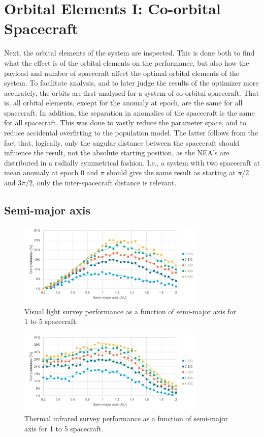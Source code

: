\section{Orbital Elements I: Co-orbital Spacecraft}
\label{sec:results_orbits_one}
Next, the orbital elements of the system are inspected. This is done both to find what the effect is of the orbital elements on the performance, but also how the payload and number of spacecraft affect the optimal orbital elements of the system. To facilitate analysis, and to later judge the results of the optimizer more accurately, the orbits are first analysed for a system of co-orbital spacecraft. That is, all orbital elements, except for the anomaly at epoch, are the same for all spacecraft. In addition, the separation in anomalies of the spacecraft is the same for all spacecraft. This was done to vastly reduce the parameter space, and to reduce accidental overfitting to the population model. The latter follows from the fact that, logically, only the angular distance between the spacecraft should influence the result, not the absolute starting position, as the NEA's are distributed in a radially symmetrical fashion. I.e., a system with two spacecraft at mean anomaly at epoch $0$ and $\pi$ should give the same result as starting at $\pi/2$ and $3\pi/2$, only the inter-spacecraft distance is relevant.\\

\subsection{Semi-major axis}

\begin{figure}[htbp]
 \centering
 \includegraphics[width=0.8\textwidth]{img/vis_semi_maj.pdf}
 \caption{Visual light survey performance as a function of semi-major axis for 1 to 5 spacecraft.}
 \label{fig:vis_semi_maj}
\end{figure}

\begin{figure}[htbp]
 \centering
 \includegraphics[width=0.8\textwidth]{img/tir_semi_maj.pdf}
 \caption{Thermal infrared survey performance as a function of semi-major axis for 1 to 5 spacecraft.}
 \label{fig:tir_semi_maj}
\end{figure}

